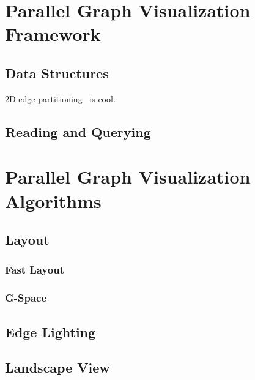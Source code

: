 \documentclass[pdf,12pt,report,strict]{SANDreport}
\newcommand*{\lcite}[1]{~\cite{#1}}
\begin{document}
\chapter{Parallel Graph Visualization Framework}
\label{sec:ParallelGraphVisualizationFramework}

\section{Data Structures}
\label{sec:ParallelGraphVisualizationFramework:DataStructures}

2D edge partitioning\lcite{Yoo05} is cool.

\section{Reading and Querying}
\label{sec:ParallelGraphVisualizationFramework:ReadingAndQuerying}


\chapter{Parallel Graph Visualization Algorithms}
\label{chap:ParallelGraphVisualizationAlgorithms}

\section{Layout}
\label{sec:ParallelGraphVisualizationAlgorithms:Layout}

\subsection{Fast Layout}
\label{sec:ParallelGraphVisualizationAlgorithms:Layout:FastLayout}

\subsection{G-Space}
\label{sec:ParallelGraphVisualizationAlgorithms:Layout:GSpace}

\section{Edge Lighting}
\label{sec:ParallelGraphVisualizationAlgorithms:EdgeLighting}

\section{Landscape View}
\label{sec:ParallelGraphVisualizationAlgorithms:LandscapeView}
\end{document}
